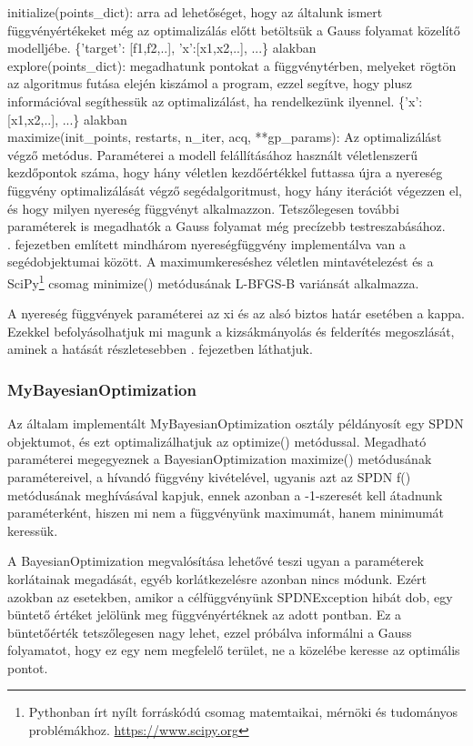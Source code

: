 initialize(points\_dict): arra ad lehetőséget, hogy az általunk ismert függvényértékeket még az optimalizálás előtt betöltsük a Gauss folyamat közelítő modelljébe. \{'target': [f1,f2,..], 'x':[x1,x2,..], ...\} alakban\\
explore(points\_dict): megadhatunk pontokat a függvénytérben, melyeket rögtön az algoritmus futása elején kiszámol a program, ezzel segítve, hogy plusz információval segíthessük az optimalizálást, ha rendelkezünk ilyennel. \{'x':[x1,x2,..], ...\} alakban\\
maximize(init\_points, restarts, n\_iter, acq, **gp\_params): Az optimalizálást végző metódus. Paraméterei a modell felállításához használt véletlenszerű kezdőpontok száma, hogy hány véletlen kezdőértékkel futtassa újra a nyereség függvény optimalizálását végző segédalgoritmust, hogy hány iterációt végezzen el, és hogy milyen nyereség függvényt alkalmazzon. Tetszőlegesen további paraméterek is megadhatók a Gauss folyamat még precízebb testreszabásához.\\

. fejezetben említett mindhárom nyereségfüggvény implementálva van a segédobjektumai között. A maximumkereséshez véletlen mintavételezést és a SciPy\footnote{Pythonban írt nyílt forráskódú csomag matemtaikai, mérnöki és tudományos problémákhoz. \url{https://www.scipy.org}} csomag minimize() metódusának L-BFGS-B variánsát alkalmazza.

A nyereség függvények paraméterei az xi és az alsó biztos határ esetében a kappa. Ezekkel befolyásolhatjuk mi magunk a kizsákmányolás és felderítés megoszlását, aminek a hatását részletesebben . fejezetben láthatjuk.

\subsubsection{MyBayesianOptimization}
Az általam implementált MyBayesianOptimization osztály példányosít egy SPDN objektumot, és ezt optimalizálhatjuk az optimize() metódussal. Megadható paraméterei megegyeznek a BayesianOptimization maximize() metódusának paramétereivel, a hívandó függvény kivételével, ugyanis azt az SPDN f() metódusának meghívásával kapjuk, ennek azonban a -1-szeresét kell átadnunk paraméterként, hiszen mi nem a függvényünk maximumát, hanem minimumát keressük.

A BayesianOptimization megvalósítása lehetővé teszi ugyan a paraméterek korlátainak megadását, egyéb korlátkezelésre azonban nincs módunk. Ezért azokban az esetekben, amikor a célfüggvényünk SPDNException hibát dob, egy büntető értéket jelölünk meg függvényértéknek az adott pontban. Ez a büntetőérték tetszőlegesen nagy lehet, ezzel próbálva informálni a Gauss folyamatot, hogy ez egy nem megfelelő terület, ne a közelébe keresse az optimális pontot.

